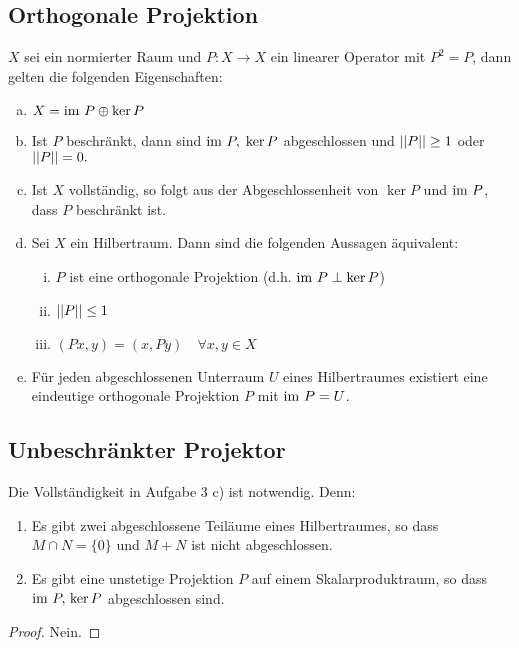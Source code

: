\documentclass[FunkAnaskriptSS2017.tex]{subfiles}
\begin{document}
\subsection{ Orthogonale Projektion}
\label{B6.3}
	$X$ sei ein normierter Raum und $P: X \to X$ ein linearer Operator mit $P^2 = P$, dann gelten die folgenden Eigenschaften:
	\begin{enumerate}[(a)]
		\item $X = \textnormal{im } P \oplus \ker P$
		\item Ist $P$ beschränkt, dann sind $\textnormal{im } P,\; \ker P$ abgeschlossen und $\left\lvert \left\lvert  P  \right\rvert \right\rvert \geq 1$ oder $\left\lvert \left\lvert  P  \right\rvert \right\rvert = 0.$
		\item Ist $X$ vollständig, so folgt aus der Abgeschlossenheit von $\ker P$ und $\textnormal{im } P$, dass $P$ beschränkt ist.
		\item Sei $X$ ein Hilbertraum. Dann sind die folgenden Aussagen äquivalent: 
		\begin{enumerate}[(i)]
			\item $P$ ist eine orthogonale Projektion (d.h. $\textnormal{im } P \perp \ker P$)
			\item $\left\lvert \left\lvert  P  \right\rvert \right\rvert \leq 1$
			
			\item $(Px, y) = (x, Py) \quad  \forall x,y \in X$
		\end{enumerate}
		\item Für jeden abgeschlossenen Unterraum $U$ eines Hilbertraumes existiert eine eindeutige orthogonale Projektion $P$ mit $\textnormal{im } P = U$.
	\end{enumerate}
	
\subsection{ Unbeschränkter Projektor}
\label{B6.4}
	Die Vollständigkeit in Aufgabe 3 c) ist notwendig. Denn:
	\begin{enumerate}
		\item Es gibt zwei abgeschlossene Teiläume eines Hilbertraumes, so dass $M \cap N = \{0 \}$ und $M+N$ ist nicht abgeschlossen.
		\item Es gibt eine unstetige Projektion $P$ auf einem Skalarproduktraum, so dass $\textnormal{im } P,\, \ker P$ abgeschlossen sind.
	\end{enumerate}

	\begin{proof}
	Nein.
	\end{proof}
\end{document}
